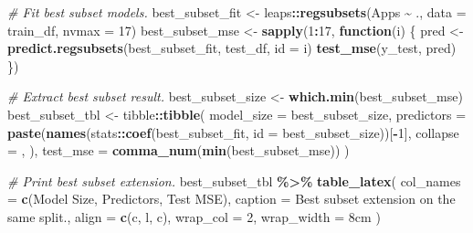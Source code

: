 \documentclass[
  10pt,
]{extarticle}
\newenvironment{Shaded}{\begin{snugshade}}{\end{snugshade}}
\newcommand{\AttributeTok}[1]{\textcolor[rgb]{0.13,0.29,0.53}{#1}}
\newcommand{\CommentTok}[1]{\textcolor[rgb]{0.56,0.35,0.01}{\textit{#1}}}
\newcommand{\ControlFlowTok}[1]{\textcolor[rgb]{0.13,0.29,0.53}{\textbf{#1}}}
\newcommand{\DecValTok}[1]{\textcolor[rgb]{0.00,0.00,0.81}{#1}}
\newcommand{\FunctionTok}[1]{\textcolor[rgb]{0.13,0.29,0.53}{\textbf{#1}}}
\newcommand{\NormalTok}[1]{#1}
\newcommand{\OtherTok}[1]{\textcolor[rgb]{0.56,0.35,0.01}{#1}}
\newcommand{\SpecialCharTok}[1]{\textcolor[rgb]{0.81,0.36,0.00}{\textbf{#1}}}
\newcommand{\StringTok}[1]{\textcolor[rgb]{0.31,0.60,0.02}{#1}}
\begin{document}
\begin{Shaded}
\begin{Highlighting}[]
\CommentTok{\# Fit best subset models.}
\NormalTok{best\_subset\_fit }\OtherTok{\textless{}{-}}\NormalTok{ leaps}\SpecialCharTok{::}\FunctionTok{regsubsets}\NormalTok{(Apps }\SpecialCharTok{\textasciitilde{}}\NormalTok{ ., }\AttributeTok{data =}\NormalTok{ train\_df, }\AttributeTok{nvmax =} \DecValTok{17}\NormalTok{)}
\NormalTok{best\_subset\_mse }\OtherTok{\textless{}{-}} \FunctionTok{sapply}\NormalTok{(}\DecValTok{1}\SpecialCharTok{:}\DecValTok{17}\NormalTok{, }\ControlFlowTok{function}\NormalTok{(i) \{}
\NormalTok{  pred }\OtherTok{\textless{}{-}} \FunctionTok{predict.regsubsets}\NormalTok{(best\_subset\_fit, test\_df, }\AttributeTok{id =}\NormalTok{ i)}
  \FunctionTok{test\_mse}\NormalTok{(y\_test, pred)}
\NormalTok{\})}

\CommentTok{\# Extract best subset result.}
\NormalTok{best\_subset\_size }\OtherTok{\textless{}{-}} \FunctionTok{which.min}\NormalTok{(best\_subset\_mse)}
\NormalTok{best\_subset\_tbl  }\OtherTok{\textless{}{-}}\NormalTok{ tibble}\SpecialCharTok{::}\FunctionTok{tibble}\NormalTok{(}
  \AttributeTok{model\_size =}\NormalTok{ best\_subset\_size,}
  \AttributeTok{predictors =} \FunctionTok{paste}\NormalTok{(}\FunctionTok{names}\NormalTok{(stats}\SpecialCharTok{::}\FunctionTok{coef}\NormalTok{(best\_subset\_fit, }\AttributeTok{id =}\NormalTok{ best\_subset\_size))[}\SpecialCharTok{{-}}\DecValTok{1}\NormalTok{], }\AttributeTok{collapse =} \StringTok{\textquotesingle{}, \textquotesingle{}}\NormalTok{),}
  \AttributeTok{test\_mse   =} \FunctionTok{comma\_num}\NormalTok{(}\FunctionTok{min}\NormalTok{(best\_subset\_mse))}
\NormalTok{)}

\CommentTok{\# Print best subset extension.}
\NormalTok{best\_subset\_tbl }\SpecialCharTok{\%\textgreater{}\%}
  \FunctionTok{table\_latex}\NormalTok{(}
    \AttributeTok{col\_names  =} \FunctionTok{c}\NormalTok{(}\StringTok{\textquotesingle{}Model Size\textquotesingle{}}\NormalTok{, }\StringTok{\textquotesingle{}Predictors\textquotesingle{}}\NormalTok{, }\StringTok{\textquotesingle{}Test MSE\textquotesingle{}}\NormalTok{),}
    \AttributeTok{caption    =} \StringTok{\textquotesingle{}Best subset extension on the same split.\textquotesingle{}}\NormalTok{,}
    \AttributeTok{align      =} \FunctionTok{c}\NormalTok{(}\StringTok{\textquotesingle{}c\textquotesingle{}}\NormalTok{, }\StringTok{\textquotesingle{}l\textquotesingle{}}\NormalTok{, }\StringTok{\textquotesingle{}c\textquotesingle{}}\NormalTok{),}
    \AttributeTok{wrap\_col   =} \DecValTok{2}\NormalTok{,}
    \AttributeTok{wrap\_width =} \StringTok{\textquotesingle{}8cm\textquotesingle{}}
\NormalTok{  )}
\end{Highlighting}
\end{Shaded}
\end{document}
